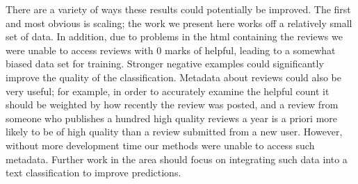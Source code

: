 \documentclass[twocolumn]{article}
\begin{document}
There are a variety of ways these results could potentially be improved. The first and most obvious is scaling; the work we present here works off a relatively small set of data. In addition, due to problems in the html containing the reviews we were unable to access reviews with 0 marks of helpful, leading to a somewhat biased data set for training. Stronger negative examples could significantly improve the quality of the classification. Metadata about reviews could also be very useful; for example, in order to accurately examine the helpful count it should be weighted by how recently the review was posted, and a review from someone who publishes a hundred high quality reviews a year is a priori more likely to be of high quality than a review submitted from a new user. However, without more development time our methods were unable to access such metadata. Further work in the area should focus on integrating such data into a text classification to improve predictions.
\end{document}
